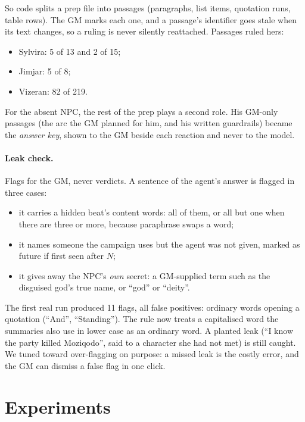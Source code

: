 \documentclass[11pt]{article}
\begin{document}
So code splits a prep file into passages (paragraphs, list items, quotation runs,
table rows). The GM marks each one, and a passage's identifier goes stale when its
text changes, so a ruling is never silently reattached. Passages ruled hers:
\begin{itemize}[nosep]
\item Sylvira: 5 of 13 and 2 of 15;
\item Jimjar: 5 of 8;
\item Vizeran: 82 of 219.
\end{itemize}
For the absent NPC, the rest of the prep plays a second role. His GM-only passages
(the arc the GM planned for him, and his written guardrails) became the \emph{answer
key}, shown to the GM beside each reaction and never to the model.

\paragraph{Leak check.}
Flags for the GM, never verdicts. A sentence of the agent's answer is flagged in three
cases:
\begin{itemize}[nosep]
\item it carries a hidden beat's content words: all of them, or all but one when there
are three or more, because paraphrase swaps a word;
\item it names someone the campaign uses but the agent was not given, marked as
future if first seen after $N$;
\item it gives away the NPC's \emph{own} secret: a GM-supplied term such as the
disguised god's true name, or ``god'' or ``deity''.
\end{itemize}

The first real run produced 11 flags, all false positives: ordinary words opening a
quotation (``And'', ``Standing''). The rule now treats a capitalised word the summaries
also use in lower case as an ordinary word. A planted leak (``I know the party killed
Moziqodo'', said to a character she had not met) is still caught. We tuned toward
over-flagging on purpose: a missed leak is the costly error, and the GM can dismiss a
false flag in one click.

\section{Experiments}\label{sec:backtests}
\end{document}
